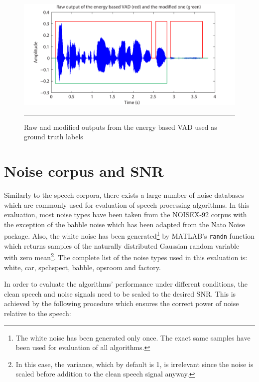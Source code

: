 \begin{figure}[htbp]
	\centering
		\includegraphics[width=1.0\columnwidth]{Figures/Chapter3/groundtruthbold.pdf}
		\rule{37em}{0.5pt}
	\caption[Raw and modified outputs from the energy based VAD used as ground truth labels]{Raw and modified outputs from the energy based VAD used as ground truth labels}
	\label{fig:groundtruth}
\end{figure}


\section{Noise corpus and SNR}

Similarly to the speech corpora, there exists a large number of noise databases which are commonly used for evaluation of speech processing algorithms. In this evaluation, most noise types have been taken from the NOISEX-92 \cite{NOISEX} corpus with the exception of the babble noise which has been adapted from the Nato Noise \cite{Nato} package. Also, the white noise has been generated\footnote{The white noise has been generated only once. The exact same samples have been used for evaluation of all algorithms.} by MATLAB's \texttt{randn} function which returns samples of the naturally distributed Gaussian random variable with zero mean\footnote{In this case, the variance, which by default is 1, is irrelevant since the noise is scaled before addition to the clean speech signal anyway.}. The complete list of the noise types used in this evaluation is: white, car, spchspect, babble, opsroom and factory.

In order to evaluate the algorithms' performance under different conditions, the clean speech and noise signals need to be scaled to the desired SNR. This is achieved by the following procedure which ensures the correct power of noise relative to the speech:

